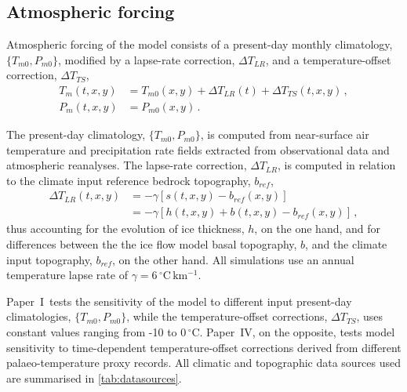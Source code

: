 \documentclass{article}
\newcommand{\unit}[1]{\ensuremath{\mathrm{#1}}}
\newcommand{\degree}[0]{\ensuremath{^{\circ}}}
\newcommand{\degC}[0]{\unit{{\degree}C}}
\newcommand{\CCLI}[0]{Paper~I}      %
\newcommand{\CCYC}[0]{Paper~IV}     %
\begin{document}
\subsection{Atmospheric forcing}

Atmospheric forcing of the model consists of a present-day monthly climatology,
$\{T_{m0}, P_{m0}\}$, modified by a lapse-rate correction, ${\Delta}T_{LR}$,
and a temperature-offset correction, ${\Delta}T_{TS}$,
\begin{subequations}
\begin{align}
    T_m(t, x, y) &= T_{m0}(x, y) + {\Delta}T_{LR}(t)
                                 + {\Delta}T_{TS}(t, x, y) \,, \\
    P_m(t, x, y) &= P_{m0}(x, y) \,.
\end{align}
\end{subequations}

The present-day climatology, $\{T_{m0}, P_{m0}\}$, is computed from
near-surface air temperature and precipitation rate fields extracted from
observational data and atmospheric reanalyses.
The lapse-rate correction, ${\Delta}T_{LR}$, is computed in relation to the
climate input reference bedrock topography, $b_{ref}$,
\begin{align}
    {\Delta}T_{LR}(t, x, y) &= -\gamma [s(t, x, y)-b_{ref}(x, y)] \\
                            &= -\gamma [h(t, x, y)+b(t, x, y)-b_{ref}(x, y)]\,,
\end{align}
thus accounting for the evolution of ice thickness, $h$, on the one hand, and
for differences between the the ice flow model basal topography, $b$, and the
climate input topography, $b_{ref}$, on the other hand. All simulations use an
annual temperature lapse rate of $\gamma = 6\,\unit{\degC\,km^{-1}}$.

\CCLI\ tests the sensitivity of the model to different input present-day
climatologies, $\{T_{m0}, P_{m0}\}$, while the temperature-offset corrections,
${\Delta}T_{TS}$, uses constant values ranging from -10 to 0\,\degC. \CCYC,
on the opposite, tests model sensitivity to time-dependent temperature-offset
corrections derived from different palaeo-temperature proxy records. All
climatic and topographic data sources used are summarised in
\cref{tab:datasources}.
\end{document}
